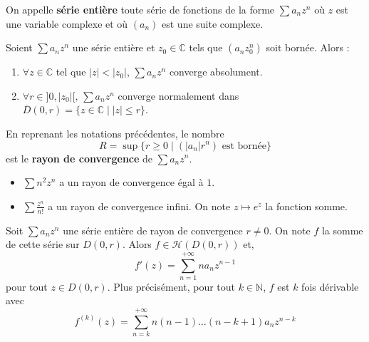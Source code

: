   \begin{definition}
    On appelle \textbf{série entière} toute série de fonctions de la forme $\sum a_n z^n$ où $z$ est une variable complexe et où $(a_n)$ est une suite complexe.
  \end{definition}

  \begin{lemma}
    Soient $\sum a_n z^n$ une série entière et $z_0 \in \mathbb{C}$ tels que $(a_n z_0^n)$ soit bornée. Alors :
    \begin{enumerate}[label={\bfseries(\roman*)}]
      \item $\forall z \in \mathbb{C}$ tel que $|z| < |z_0|$, $\sum a_n z^n$ converge absolument.
      \item $\forall r \in ]0,|z_0|[, \, \sum a_n z^n$ converge normalement dans $\overline{D}(0, r) = \{ z \in \mathbb{C} \mid |z| \leq r \}$.
    \end{enumerate}
  \end{lemma}

  \begin{definition}
    En reprenant les notations précédentes, le nombre
    \[ R = \sup \{ r \geq 0 \mid (|a_n|r^n) \text{ est bornée} \} \]
    est le \textbf{rayon de convergence} de $\sum a_n z^n$.
  \end{definition}


  \begin{example}
    \begin{itemize}
      \item $\sum n^2 z^n$ a un rayon de convergence égal à $1$.
      \item $\sum \frac{z^n}{n!}$ a un rayon de convergence infini. On note $z \mapsto e^z$ la fonction somme.
    \end{itemize}
  \end{example}


  \begin{proposition}
    Soit $\sum a_n z^n$ une série entière de rayon de convergence $r \neq 0$. On note $f$ la somme de cette série sur $D(0,r)$. Alors $f \in \mathcal{H}(D(0, r))$ et,
    \[ f'(z) = \sum_{n=1}^{+\infty} n a_n z^{n-1} \]
    pour tout $z \in D(0, r)$.
    \newpar
    Plus précisément, pour tout $k \in \mathbb{N}$, $f$ est $k$ fois dérivable avec
    \[ f^{(k)}(z) = \sum_{n=k}^{+\infty} n (n-1) \dots (n-k+1) a_n z^{n-k} \]
  \end{proposition}

